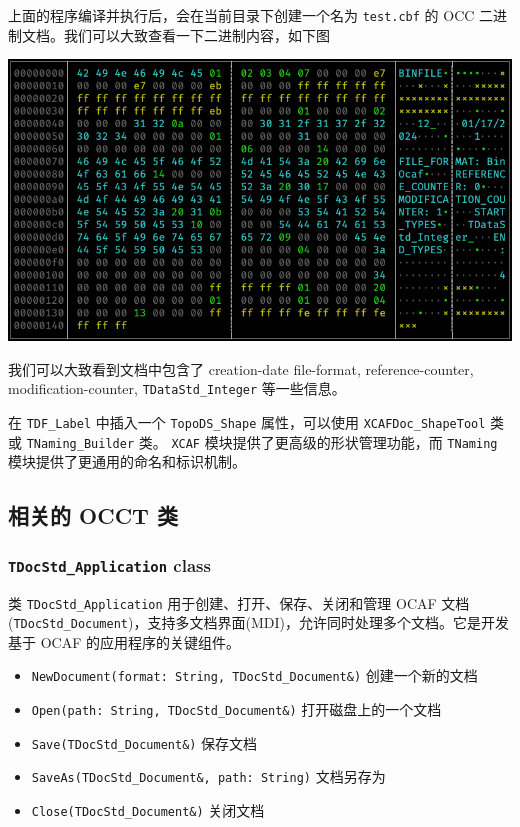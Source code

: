 \documentclass[11pt]{article}
\begin{document}
上面的程序编译并执行后，会在当前目录下创建一个名为 \texttt{test.cbf} 的 OCC 二进制文档。我们可以大致查看一下二进制内容，如下图

\begin{center}
\includegraphics[width=.9\linewidth]{./img/binocaf-binary-content.png}
\end{center}

我们可以大致看到文档中包含了 creation-date file-format, reference-counter, modification-counter, \texttt{TDataStd\_Integer} 等一些信息。

在 \texttt{TDF\_Label} 中插入一个 \texttt{TopoDS\_Shape} 属性，可以使用 \texttt{XCAFDoc\_ShapeTool} 类或 \texttt{TNaming\_Builder} 类。 \texttt{XCAF} 模块提供了更高级的形状管理功能，而 \texttt{TNaming} 模块提供了更通用的命名和标识机制。
\subsection{相关的 OCCT 类}
\label{sec:orga199c4d}

\subsubsection{\texttt{TDocStd\_Application} class}
\label{sec:org622dfb2}

类 \texttt{TDocStd\_Application} 用于创建、打开、保存、关闭和管理 OCAF 文档(\texttt{TDocStd\_Document})，支持多文档界面(MDI)，允许同时处理多个文档。它是开发基于 OCAF 的应用程序的关键组件。

\begin{itemize}
\item \texttt{NewDocument(format: String, TDocStd\_Document\&)} 创建一个新的文档
\item \texttt{Open(path: String, TDocStd\_Document\&)} 打开磁盘上的一个文档
\item \texttt{Save(TDocStd\_Document\&)} 保存文档
\item \texttt{SaveAs(TDocStd\_Document\&, path: String)} 文档另存为
\item \texttt{Close(TDocStd\_Document\&)} 关闭文档
\end{itemize}
\end{document}
